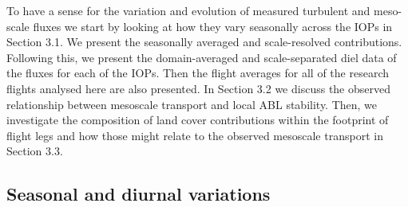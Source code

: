 \documentclass[draft]{agujournal2019}
\begin{document}
To have a sense for the variation and evolution of measured turbulent and meso- scale fluxes we start by looking at how they vary seasonally across the IOPs in Section 3.1. We present the seasonally averaged and scale-resolved contributions. Following this, we present the domain-averaged and scale-separated diel data of the fluxes for each of the IOPs. Then the flight averages for all of the research flights analysed here are also presented. In Section 3.2 we discuss the observed relationship between mesoscale transport and local ABL stability. Then, we investigate the composition of land cover contributions within the footprint of flight legs and how those might relate to the observed mesoscale transport in Section 3.3. 

\subsection{Seasonal and diurnal variations}
\end{document}
